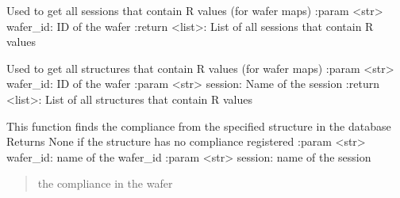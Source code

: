 \documentclass[letterpaper,10pt,english]{sphinxmanual}
\begin{document}

\begin{fulllineitems}
\label{\detokenize{getter:getter.get_R_sessions}}
\pysigstartsignatures
{}
\pysigstopsignatures
\sphinxAtStartPar
Used to get all sessions that contain R values (for wafer maps)
:param \textless{}str\textgreater{} wafer\_id: ID of the wafer
:return \textless{}list\textgreater{}: List of all sessions that contain R values

\end{fulllineitems}


\begin{fulllineitems}
\label{\detokenize{getter:getter.get_R_structures}}
\pysigstartsignatures
{}
\pysigstopsignatures
\sphinxAtStartPar
Used to get all structures that contain R values (for wafer maps)
:param \textless{}str\textgreater{} wafer\_id: ID of the wafer
:param \textless{}str\textgreater{} session: Name of the session
:return \textless{}list\textgreater{}: List of all structures that contain R values

\end{fulllineitems}


\begin{fulllineitems}
\label{\detokenize{getter:getter.get_compliance}}
\pysigstartsignatures
{}
\pysigstopsignatures
\sphinxAtStartPar
This function finds the compliance from the specified structure in the database
Returns None if the structure has no compliance registered
:param \textless{}str\textgreater{} wafer\_id: name of the wafer\_id
:param \textless{}str\textgreater{} session: name of the session
\begin{quote}\begin{description}
\sphinxAtStartPar
the compliance in the wafer

\end{description}\end{quote}

\end{fulllineitems}
\end{document}
